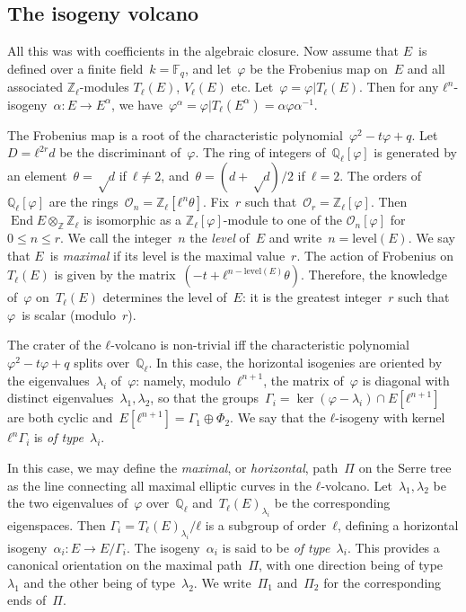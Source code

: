 \documentclass{article}%
\DeclareMathOperator{\End}{End}
\def\level#1{\mathrm{level}\pa{#1}}
\def\F{\mathbb{F}}
\def\pa#1{\left(#1\right)}
\let\ro\mathscr
\begin{document}
\subsection{The isogeny volcano}%
All this was with coefficients in the algebraic closure. Now assume that
$E$~is defined over a finite field~$k = \F_q$, and let~$φ$ be the
Frobenius map on~$E$ and all associated $ℤ_{ℓ}$-modules $T_{ℓ}(E)$,
$V_{ℓ}(E)$ etc. Let~$φ = φ|T_{ℓ}(E)$. Then for any $ℓ^n$-isogeny~$α: E →
E^{α}$, we have~$φ^{α} = φ|T_{ℓ}(E^{α}) = α φ α^{-1}$.

\medskip

The Frobenius map is a root of the characteristic polynomial~$φ^2 - t φ +
q$. Let~$D = ℓ^{2r} d$ be the discriminant of~$φ$. The ring of integers
of~$ℚ_{ℓ}[φ]$ is generated by an element~$θ = √{d}$ if~$ℓ ≠ 2$, and~$θ =
(d+√{d})/2$ if~$ℓ = 2$. The orders of~$ℚ_{ℓ}[φ]$ are the rings~$\ro O_{n}
= ℤ_{ℓ}[ℓ^n θ]$. Fix~$r$ such that~$\ro O_{r} = ℤ_{ℓ}[φ]$. Then $\End E
⊗_{ℤ} ℤ_{ℓ}$ is isomorphic as a $ℤ_{ℓ}[φ]$-module to one of the $\ro
O_{n}[φ]$ for~$0 ≤ n ≤ r$. We call the integer~$n$ the \emph{level}
of~$E$ and write~$n = \level {E}$. We say that $E$~is \emph{maximal} if
its level is the maximal value~$r$. The action of Frobenius on~$T_{ℓ}(E)$
is given by the matrix~$(-t+ℓ^{n-\level{E}} θ)$. Therefore, the knowledge
of~$φ$ on~$T_{ℓ}(E)$ determines the level of~$E$: it is the greatest
integer~$r$ such that $φ$~is scalar (modulo~$r$).

The crater of the $ℓ$-volcano is non-trivial iff the characteristic
polynomial~$φ^2 -t φ + q$ splits over~$ℚ_{ℓ}$. In this case, the
horizontal isogenies are oriented by the eigenvalues~$λ_i$ of~$φ$:
namely, modulo~$ℓ^{n+1}$, the matrix of~$φ$ is diagonal with distinct
eigenvalues~$λ_1, λ_2$, so that the groups~$Γ_i = \ker (φ-λ_i) ∩
E[ℓ^{n+1}]$ are both cyclic and~$E[ℓ^{n+1}] = Γ_1 ⊕ Φ_2$. We say that the
$ℓ$-isogeny with kernel~$ℓ^{n} Γ_i$ is \emph{of type~$λ_i$}.

In this case, we may define the \emph{maximal}, or \emph{horizontal},
path~$Π$ on the Serre tree as the line connecting all maximal elliptic
curves in the $ℓ$-volcano. Let~$λ_1, λ_2$ be the two eigenvalues of~$φ$
over~$ℚ_{ℓ}$ and~$T_{ℓ}(E)_{λ_i}$ be the corresponding eigenspaces. Then
$Γ_i = T_{ℓ}(E)_{λ_i}/ℓ $ is a subgroup of order~$ℓ$, defining a
horizontal isogeny~$α_i: E → E/Γ_i$. The isogeny~$α_i$ is said to be
\emph{of type~$λ_i$}. This provides a canonical orientation on the
maximal path~$Π$, with one direction being of type~$λ_1$ and the other
being of type~$λ_2$. We write~$Π_1$ and~$Π_2$ for the corresponding ends
of~$Π$.
\end{document}
